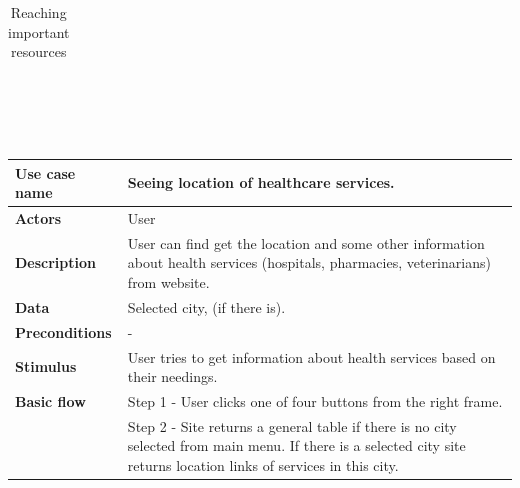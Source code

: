 \begin{center}
\begin{table}[H]
\begin{tabular}{| m{3cm}| m{10cm} |}
            \hline
        \end{tabular}
        \caption[Reaching important resources]{Reaching important resources}
    \end{table}
    ~\\~\\~\\
    \begin{table}[H]
        \begin{tabular}{| m{3cm}| m{10cm} |}
            \hline
            \textbf{Use case name}    & Seeing location of healthcare services.                                                                                                                              \\
            \hline
            \textbf{Actors}           & User                                                                                                                                                                 \\
            \hline
            \textbf{Description}      & User can find get the location and some other information about health services (hospitals, pharmacies, veterinarians) from website.                                 \\
            \hline
            \textbf{Data}             & Selected city, (if there is).                                                                                                                                        \\
            \hline
            \textbf{Preconditions}    & -                                                                                                                                                                    \\
            \hline
            \textbf{Stimulus}         & User tries to get information about health services based on their needings.                                                                                         \\
            \hline
            \textbf{Basic flow}       & Step 1 - User clicks one of four buttons from the right frame.                                                                                                       \\
                                      & Step 2 - Site returns a general table if there is no city selected from main menu. If there is a selected city site returns location links of services in this city. \\

\end{tabular}
\end{table}
\end{center}
